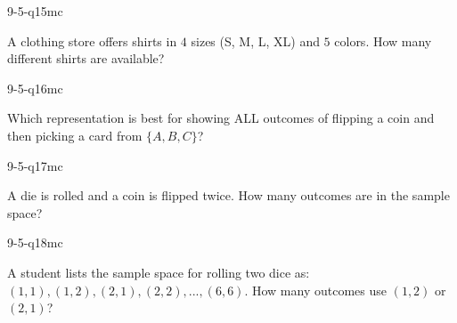 \begin{practiceQuestion}{9-5-q15}{mc}
\begin{questionText}
A clothing store offers shirts in $4$ sizes (S, M, L, XL) and $5$ colors. How many different shirts are available?
\end{questionText}
\end{practiceQuestion}

\begin{practiceQuestion}{9-5-q16}{mc}
\begin{questionText}
Which representation is best for showing ALL outcomes of flipping a coin and then picking a card from $\{A, B, C\}$?
\end{questionText}
\end{practiceQuestion}

\begin{practiceQuestion}{9-5-q17}{mc}
\begin{questionText}
A die is rolled and a coin is flipped twice. How many outcomes are in the sample space?
\end{questionText}
\end{practiceQuestion}

\begin{practiceQuestion}{9-5-q18}{mc}
\begin{questionText}
A student lists the sample space for rolling two dice as: $(1,1), (1,2), (2,1), (2,2), ..., (6,6)$. How many outcomes use $(1,2)$ or $(2,1)$?
\end{questionText}
\end{practiceQuestion}


